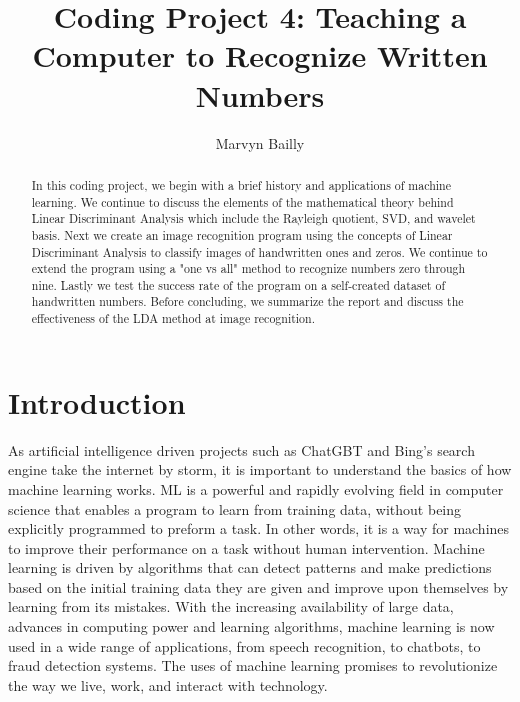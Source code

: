 \documentclass[12pt]{article}%
\numberwithin{equation}{subsection}
\begin{document}
\title{Coding Project 4:  Teaching a Computer to Recognize Written Numbers}

\author{Marvyn Bailly}
\date{}

\maketitle


\begin{abstract}
In this coding project, we begin with a brief history and applications of machine learning. We continue to discuss the elements of the mathematical theory behind Linear Discriminant Analysis which include the Rayleigh quotient, SVD, and wavelet basis. Next we create an image recognition program using the concepts of Linear Discriminant Analysis to classify images of handwritten ones and zeros. We continue to extend the program using a "one vs all" method to recognize numbers zero through nine. Lastly we test the success rate of the program on a self-created dataset of handwritten numbers. Before concluding, we summarize the report and discuss the effectiveness of the LDA method at image recognition.  
\end{abstract}


\section{Introduction}
\label{Sec: Intro}


As artificial intelligence driven projects such as ChatGBT and Bing's search engine take the internet by storm, it is important to understand the basics of how machine learning works. ML is a powerful and rapidly evolving field in computer science that enables a program to learn from training data, without being explicitly programmed to preform a task. In other words, it is a way for machines to improve their performance on a task without human intervention. Machine learning is driven by algorithms that can detect patterns and make predictions based on the initial training data they are given and improve upon themselves by learning from its mistakes. With the increasing availability of large data, advances in computing power and learning algorithms, machine learning is now used in a wide range of applications, from speech recognition, to chatbots, to fraud detection systems. The uses of machine learning promises to revolutionize the way we live, work, and interact with technology.  

\bigskip
\bigskip
\end{document}
